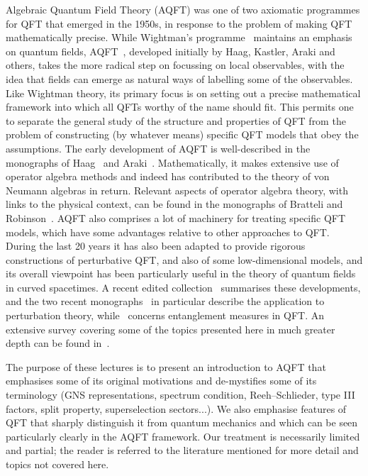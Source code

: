\documentclass[12pt]{article}
\newcommand{\1}{\mathds{1}}                         %
\begin{document}
	Algebraic Quantum Field Theory (AQFT) was one of two axiomatic programmes for QFT that emerged in the 1950s, in response to the problem of making QFT mathematically precise.
	While Wightman's programme~\cite{StreaterWightman} maintains an emphasis on quantum fields, AQFT~\cite{Haag,Araki}, developed initially by Haag, Kastler, Araki and others, takes the more radical step on focussing on local observables, with the idea that fields can emerge as natural ways of labelling some of the observables. Like Wightman theory, its primary focus is on setting out a precise mathematical framework into which all QFTs worthy of the name should fit. This permits one to separate the general study of the structure and properties of QFT from the problem of constructing (by whatever means) specific QFT models that obey the assumptions. 
	The early development of AQFT is well-described in the monographs of Haag~\cite{Haag} and Araki~\cite{Araki}. Mathematically, it makes extensive use of operator algebra methods and indeed has contributed to the theory of von Neumann algebras in return. Relevant aspects of operator algebra theory, with links to the physical context, can be found in the monographs of Bratteli and Robinson~\cite{BratRob:vol1,BratRob:vol2}.
	AQFT also comprises a lot of machinery for treating specific QFT models, which have some advantages relative to other approaches to QFT. 
	During the last 20 years it has also been adapted to provide rigorous constructions of perturbative QFT, and also of some low-dimensional models, and its overall viewpoint
	has been particularly useful in the theory of quantum fields in curved spacetimes. A recent edited collection~\cite{AdvAQFT} summarises these developments, and the two recent monographs~\cite{Rejzner_book,duetsch2019classical} in particular describe the application to perturbation theory, while~\cite{hollands2018entanglement} concerns entanglement measures in QFT. An extensive survey covering some of the topics presented here in much greater depth can be found in~\cite{HalvorsenMueger:2006}.
	
	The purpose of these lectures is to present an introduction to AQFT
	that emphasises some of its original motivations and de-mystifies some of its terminology (GNS representations, spectrum condition, Reeh--Schlieder, type III factors, split property, superselection sectors...). We also emphasise features of QFT that sharply distinguish it from quantum mechanics and which can be seen particularly clearly in the AQFT framework. Our treatment is necessarily limited and partial; the reader is referred to the literature mentioned for more detail and topics not covered here. 
	
\end{document}
